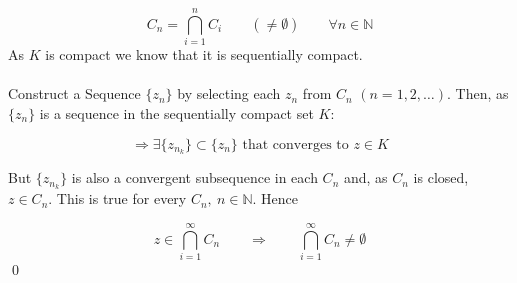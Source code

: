 \documentclass[12pt,a4paper]{article}
\begin{document}
\[
C_n=\bigcap_{i=1}^{n} C_i \qquad (\neq \emptyset)\qquad \forall n\in\mathbb N
\]
As $K$ is compact we know that it is sequentially compact.\\
\\
Construct a Sequence $\{z_n\}$ by selecting each $z_n$ from $C_n$ $(n=1,2,\ldots)$.  Then, as $\{z_n\}$ is a sequence in the sequentially compact set $K$:

\[
\Rightarrow \exists \{z_{n_k}\}\subset\{z_n\} \text{ that converges to } z\in K
\]

But $\{z_{n_k}\}$ is also a convergent subsequence in each $C_n$ and, as $C_n$ is closed, $z\in C_n$. This is true for every $C_n,\ n\in\mathbb N$. Hence

\[
z\in\bigcap_{i=1}^{\infty} C_n
\qquad\Rightarrow\qquad
\bigcap_{i=1}^{\infty} C_n\neq\emptyset
\]
\qed
\end{document}
